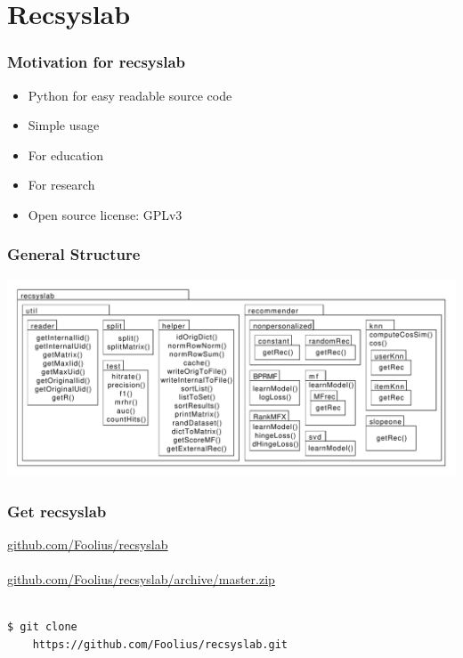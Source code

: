 \documentclass[mathserif,svgnames]{beamer}
\begin{document}
\section{Recsyslab}
\begin{frame} 
\frametitle{Motivation for recsyslab} %
\begin{itemize}
    \item Python for easy readable source code
    \item Simple usage
    \item For education
    \item For research
    \item Open source license: GPLv3
\end{itemize}
\end{frame}
\begin{frame}
\frametitle{General Structure}
\begin{centering}
    \includegraphics[page=1, scale=0.34]{packagediagram.pdf}
\end{centering}
\end{frame}
\begin{frame}[fragile]
    \frametitle{Get recsyslab}
    \url{github.com/Foolius/recsyslab}\\
    \hspace*{8cm}\\
    \url{github.com/Foolius/recsyslab/archive/master.zip}\\
    \hspace*{8cm}\\
    \begin{lstlisting}[style=pseudocode]
$ git clone 
    https://github.com/Foolius/recsyslab.git
    \end{lstlisting}
\end{frame}
\end{document}
